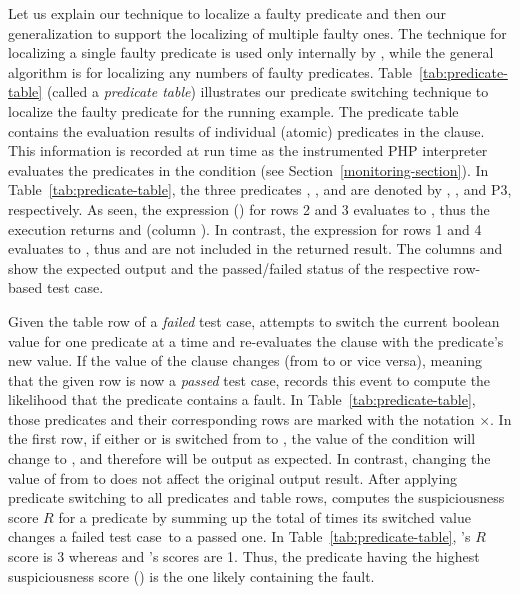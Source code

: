 Let us explain our technique to localize a faulty predicate and
then our generalization to support the localizing of multiple faulty
ones.  The technique for localizing a single faulty predicate is used
only internally by {\tool}, while the general algorithm is for localizing
any numbers of faulty predicates. Table~\ref{tab:predicate-table}
(called a \emph{predicate table}) illustrates our predicate switching
technique to localize the faulty predicate for the running example.
The predicate table contains the evaluation results of individual
(atomic) predicates in the  clause. This information is
recorded at run time as the instrumented PHP interpreter evaluates the
predicates in the
 condition (see Section~\ref{monitoring-section}). In
Table~\ref{tab:predicate-table}, the three predicates , , and  are denoted
by , , and {P3}, respectively. As seen, the
 expression () for rows 2 and 3
evaluates to , thus the execution returns
 and  (column ). In contrast,
the  expression for rows 1 and 4 evaluates to
, thus  and  are not included in
the returned result. The columns  and
 show the expected output and the passed/failed
status of the respective row-based test case.


Given the table row of a \emph{failed} test case, \tool{} attempts to
switch the current boolean value for one predicate at a time and
re-evaluates the  clause with the predicate's new
value. If the value of the  clause changes (from
 to  or vice versa), meaning that the given row
is now a \emph{passed} test case, \tool{} records this event to
compute the likelihood that the predicate contains a fault. In
Table~\ref{tab:predicate-table}, those predicates and their
corresponding rows are marked with the notation $\times$. In the first
row, if either  or  is switched from  to
, the value of the
 condition  will change to
, and therefore  will be output as expected. 
In contrast, changing the value of  from  to
 does not affect the original output result. After
applying predicate switching to all predicates and table rows,
\tool{} computes the suspiciousness score $R$ for a predicate by
summing up the total of times its switched value changes a failed test
case~to a passed one. In Table~\ref{tab:predicate-table}, 's
$R$ score is 3 whereas  and 's scores are 1.
Thus, the predicate having the highest suspiciousness score
() is the one likely containing the fault.


